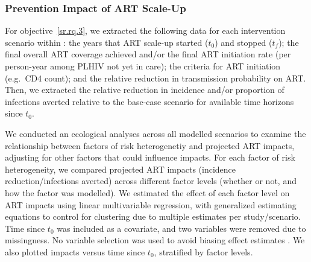 \subsubsection{Prevention Impact of ART Scale-Up}\label{sr.meth.data.api}
For objective~\ref{sr.rq.3}, we extracted
the following data for each intervention scenario within :
the years that ART scale-up started ($t_0$) and stopped ($t_f$);
the final overall ART coverage achieved and/or
the final ART initiation rate (per person-year among PLHIV not yet in care);
the criteria for ART initiation (e.g.\ CD4 count); and
the relative reduction in transmission probability on ART.
Then, we extracted the
relative reduction in incidence and/or proportion of infections averted
relative to the base-case scenario for available time horizons since $t_0$.
\par
We conducted an ecological analyses across all modelled scenarios to examine the relationship between
factors of risk heterogenetiy and projected ART impacts,
adjusting for other factors that could influence impacts.
For each factor of risk heterogeneity, we compared
projected ART impacts (incidence reduction/infections averted)
across different factor levels (whether or not, and how the factor was modelled).
We estimated the effect of each factor level on ART impacts
using linear multivariable regression, with generalized estimating equations \cite{Hojsgaard2006}
to control for clustering due to multiple estimates per study/scenario.
Time since $t_0$ was included as a covariate, and two variables were removed due to missingness.
No variable selection was used to avoid biasing effect estimates \cite{Harrell2001}.
We also plotted impacts versus time since $t_0$, stratified by factor levels.
